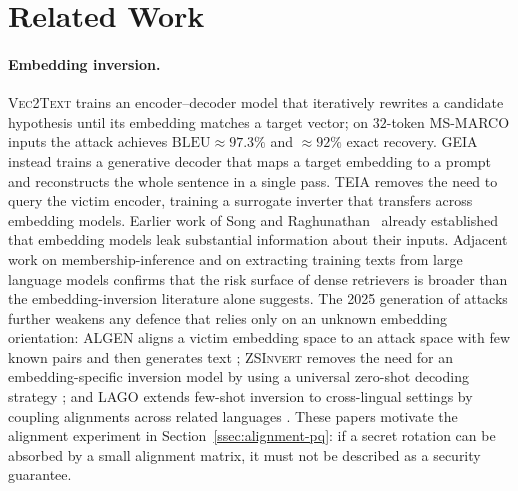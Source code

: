 \section{Related Work}\label{sec:related}

\paragraph{Embedding inversion.} \textsc{Vec2Text} \cite{ref_vec2text}
trains an encoder--decoder model that iteratively rewrites a candidate
hypothesis until its embedding matches a target vector; on
$32$-token \textsc{MS-MARCO} inputs the attack achieves
$\mathrm{BLEU} \approx 97.3\%$ and $\approx 92\%$ exact recovery.
\textsc{GEIA} \cite{ref_geia} instead trains a generative decoder that maps
a target embedding to a prompt and reconstructs the whole sentence in a
single pass. \textsc{TEIA} \cite{ref_teia} removes the need to query the
victim encoder, training a surrogate inverter that transfers across
embedding models. Earlier work of Song and
Raghunathan~\cite{ref_song_leak} already established that embedding models
leak substantial information about their inputs. Adjacent work on
membership-inference \cite{ref_shokri} and on extracting training
texts from large language models \cite{ref_carlini} confirms that the
risk surface of dense retrievers is broader than the embedding-inversion
literature alone suggests. The 2025 generation of attacks further
weakens any defence that relies only on an unknown embedding orientation:
\textsc{ALGEN} aligns a victim embedding space to an attack space with
few known pairs and then generates text \cite{ref_algen};
\textsc{ZSInvert} removes the need for an embedding-specific inversion
model by using a universal zero-shot decoding strategy
\cite{ref_zsinvert}; and \textsc{LAGO} extends few-shot inversion to
cross-lingual settings by coupling alignments across related languages
\cite{ref_lago}. These papers motivate the alignment experiment in
Section~\ref{ssec:alignment-pq}: if a secret rotation can be absorbed by
a small alignment matrix, it must not be described as a security
guarantee.

